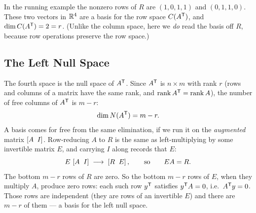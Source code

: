 

In the running example the nonzero rows of $R$ are $(1,0,1,1)$ and $(0,1,1,0)$. These two vectors in $\mathbb{R}^4$ are a basis for the row space $C(A^{\mathsf T})$, and $\dim C(A^{\mathsf T})=2=r$. (Unlike the column space, here we \emph{do} read the basis off $R$, because row operations preserve the row space.)

\subsection{The Left Null Space}

The fourth space is the null space of $A^{\mathsf T}$. Since $A^{\mathsf T}$ is $n\times m$ with rank $r$ (rows and columns of a matrix have the same rank, and $\operatorname{rank} A^{\mathsf T} = \operatorname{rank} A$), the number of free columns of $A^{\mathsf T}$ is $m-r$:
\[
   \dim N(A^{\mathsf T}) = m - r.
\]
A basis comes for free from the same elimination, if we run it on the \emph{augmented} matrix $\left[A \;\; I\right]$. Row-reducing $A$ to $R$ is the same as left-multiplying by some invertible matrix $E$, and carrying $I$ along records that $E$:
\[
   E\,\left[A \;\; I\right] \;\longrightarrow\; \left[R \;\; E\right],
   \qquad \text{so} \qquad EA = R.
\]
The bottom $m-r$ rows of $R$ are zero. So the bottom $m-r$ rows of $E$, when they multiply $A$, produce zero rows: each such row $y^{\mathsf T}$ satisfies $y^{\mathsf T} A = 0$, i.e.\ $A^{\mathsf T} y = 0$. Those rows are independent (they are rows of an invertible $E$) and there are $m-r$ of them --- a basis for the left null space.

